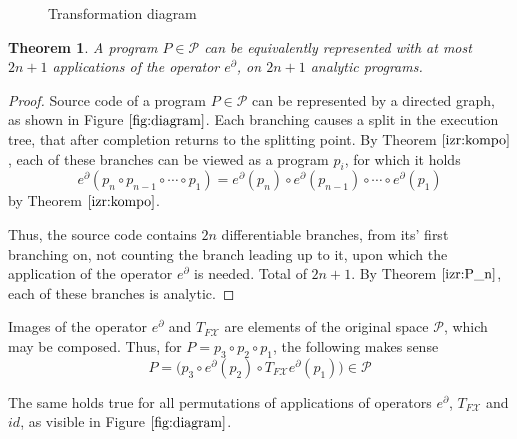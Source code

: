 \documentclass{article}
\newcommand{\X}{\mathcal{X}}
\newcommand{\dP}{\mathcal{P}}
\newcommand{\D}{\partial}
\newtheorem{izrek}{Theorem}[section]
\begin{document}
\begin{figure}[!h]
\vspace{3px}
\caption{Transformation diagram} \label{fig:diagram} 
\end{figure}

\begin{izrek}
A program $P\in\dP$ can be equivalently represented with at most $2n+1$ applications of the operator $e^\D$, on $2n+1$ analytic programs.
\end{izrek}

\begin{proof}
	Source code of a program $P\in\dP$ can be represented by a directed graph, as shown in Figure $\ref{fig:diagram}$. Each branching causes a split in the execution tree, that after completion returns to the splitting point.
	By Theorem $\ref{izr:kompo}$, each of these branches can be viewed as a program $p_i$, for which it holds $$e^\D(p_n\circ p_{n-1}\circ\cdots\circ p_1)=e^\D(p_n)\circ e^\D(p_{n-1})\circ\cdots\circ e^\D(p_1)$$ by Theorem $\ref{izr:kompo}$.
	
	Thus, the source code contains $2n$ differentiable branches, from its' first branching on, not counting the branch leading up to it, upon which the application of the operator $e^\D$ is needed. Total of $2n+1$. By Theorem $\ref{izr:P_n}$, each of these branches is analytic.
\end{proof}

Images of the operator $e^\D$ and $T_{F\X}$  are elements of the original space $\dP$, which may be composed. Thus, for $P=p_3\circ p_2\circ p_1$, the following makes sense
\begin{equation}
P=\Big(p_3\circ e^ \D(p_2)\circ T_{F\X}e^\D(p_1)\Big) \in \dP
\end{equation}

The same holds true for all permutations of applications of operators $e^\D$, $T_{F\X}$ and $id$, as visible in Figure $\ref{fig:diagram}$.
\end{document}
